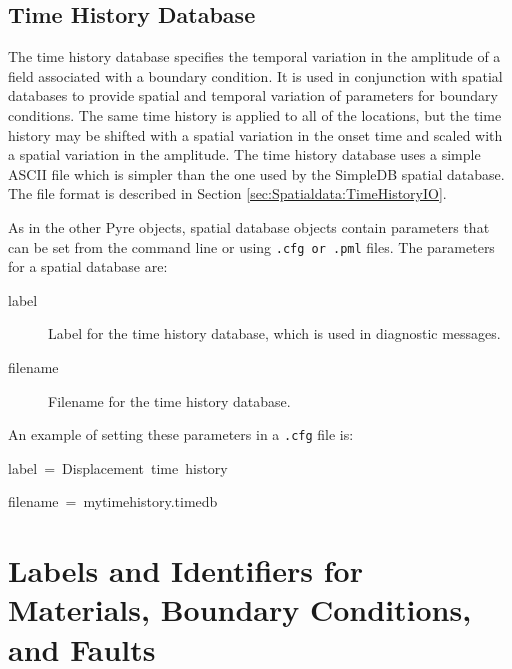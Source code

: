 \subsection{Time History Database}

The time history database specifies the temporal variation in the
amplitude of a field associated with a boundary condition. It is used
in conjunction with spatial databases to provide spatial and temporal
variation of parameters for boundary conditions. The same time history
is applied to all of the locations, but the time history may be shifted
with a spatial variation in the onset time and scaled with a spatial
variation in the amplitude. The time history database uses a simple
ASCII file which is simpler than the one used by the SimpleDB spatial
database. The file format is described in Section \ref{sec:Spatialdata:TimeHistoryIO}. 

As in the other Pyre objects, spatial database objects contain parameters
that can be set from the command line or using \texttt{.cfg or .pml}
files. The parameters for a spatial database are:
\begin{description}
\item [{label}] Label for the time history database, which is used in diagnostic
messages.
\item [{filename}] Filename for the time history database.
\end{description}
An example of setting these parameters in a \texttt{.cfg} file is:
\begin{lyxcode}
label~=~Displacement~time~history

filename~=~mytimehistory.timedb
\end{lyxcode}

\section{Labels and Identifiers for Materials, Boundary Conditions, and Faults}

